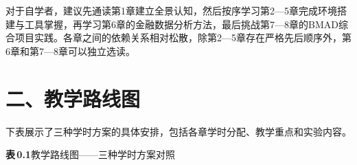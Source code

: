对于自学者，建议先通读第1章建立全景认知，然后按序学习第2—5章完成环境搭建与工具掌握，再学习第6章的金融数据分析方法，最后挑战第7—8章的BMAD综合项目实践。各章之间的依赖关系相对松散，除第2—5章存在严格先后顺序外，第6章和第7—8章可以独立选读。

\vspace{2em}


\section*{二、教学路线图}

下表展示了三种学时方案的具体安排，包括各章学时分配、教学重点和实验内容。

\vspace{1em}

\noindent\textbf{表\,0.1}\quad 教学路线图——三种学时方案对照

\vspace{0.5em}

